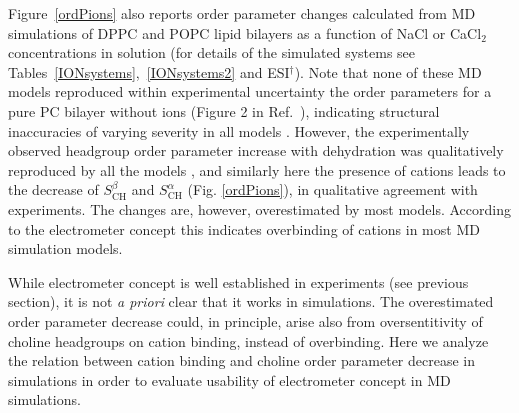 \documentclass[twoside,twocolumn,9pt]{article}
\begin{document}
Figure~\ref{ordPions} also reports order parameter changes calculated from MD simulations
of DPPC and POPC lipid bilayers as a function of NaCl or CaCl$_2$ concentrations in solution
(for details of the simulated systems see Tables~\ref{IONsystems},~\ref{IONsystems2} and ESI$^\dag$).
Note that none of these MD models
reproduced within experimental uncertainty the order parameters for a pure PC bilayer without ions
(Figure 2 in Ref.~),
indicating structural inaccuracies of varying severity in all models \cite{botan15}.
However, the experimentally observed headgroup order parameter increase with dehydration
was qualitatively reproduced by all the models \cite{botan15}, and 
similarly here the presence of cations leads to the decrease 
of $S_\mathrm{CH}^\beta$ and $S_\mathrm{CH}^\alpha$ (Fig. \ref{ordPions}), in qualitative
agreement with experiments. The changes are, however, overestimated by most models.
According to the electrometer concept this indicates overbinding of cations in most MD simulation
models.

While electrometer concept is well established in experiments (see previous section),
it is not {\it a priori} clear that it works in simulations. The overestimated order parameter
decrease could, in principle, arise also from oversentitivity of choline headgroups on cation binding,
instead of overbinding. Here we analyze the relation between cation binding and choline order 
parameter decrease in simulations in order to evaluate usability of electrometer concept in MD simulations.
\end{document}
